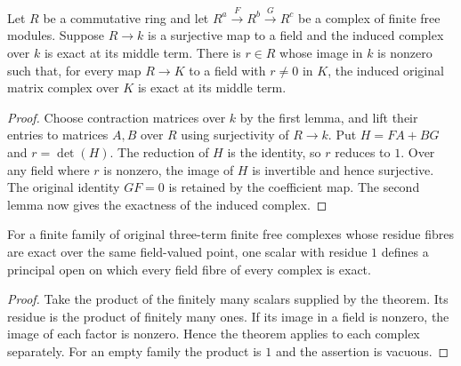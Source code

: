 \begin{theorem}
\label{thm:kn-specialization-finite-free-exactness}
\leanok
Let $R$ be a commutative ring and let
$R^a\xrightarrow{F}R^b\xrightarrow{G}R^c$ be a complex of finite
free modules.  Suppose $R\to k$ is a surjective map to a field and
the induced complex over $k$ is exact at its middle term.  There is
$r\in R$ whose image in $k$ is nonzero such that, for every map
$R\to K$ to a field with $r\ne0$ in $K$, the induced original
matrix complex over $K$ is exact at its middle term.
\end{theorem}
\begin{proof}
Choose contraction matrices over $k$ by the first lemma, and lift
their entries to matrices $A,B$ over $R$ using surjectivity of
$R\to k$.  Put $H=FA+BG$ and $r=\det(H)$.  The reduction of $H$
is the identity, so $r$ reduces to $1$.  Over any field where $r$
is nonzero, the image of $H$ is invertible and hence surjective.
The original identity $GF=0$ is retained by the coefficient map.
The second lemma now gives the exactness of the induced complex.
\end{proof}

\begin{corollary}
\label{cor:kn-specialization-uniform-finite-free-exactness}
\leanok
{}
For a finite family of original three-term finite free complexes whose
residue fibres are exact over the same field-valued point, one scalar
with residue $1$ defines a principal open on which every field fibre
of every complex is exact.
\end{corollary}
\begin{proof}
Take the product of the finitely many scalars supplied by the theorem.
Its residue is the product of finitely many ones.  If its image in a
field is nonzero, the image of each factor is nonzero.  Hence the
theorem applies to each complex separately.  For an empty family the
product is $1$ and the assertion is vacuous.
\end{proof}

